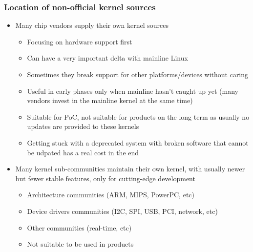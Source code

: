 \begin{frame}
  \frametitle{Location of non-official kernel sources}
  \begin{itemize}
  \item Many chip vendors supply their own kernel sources
    \begin{itemize}
    \item Focusing on hardware support first
    \item Can have a very important delta with mainline Linux
    \item Sometimes they break support for other platforms/devices
      without caring
    \item Useful in early phases only when mainline hasn't caught up yet
      (many vendors invest in the mainline kernel at the same time)
    \item Suitable for PoC, not suitable for products on the long term
      as usually no updates are provided to these kernels
    \item Getting stuck with a deprecated system with broken software
      that cannot be udpated has a real cost in the end
    \end{itemize}
  \item Many kernel sub-communities maintain their own kernel, with
    usually newer but fewer stable features, only for cutting-edge
    development
    \begin{itemize}
    \item Architecture communities (ARM, MIPS, PowerPC, etc)
    \item Device drivers communities (I2C, SPI, USB, PCI, network, etc)
    \item Other communities (real-time, etc)
    \item Not suitable to be used in products
    \end{itemize}
  \end{itemize}
\end{frame}

